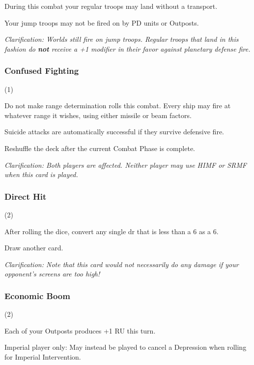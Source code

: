 
During this combat your regular troops may land without a transport.

Your jump troops may not be fired on by PD units or Outposts.

\textit{Clarification: Worlds still fire on jump troops. Regular troops that land in this fashion do \textbf{not} receive a +1 modifier in their favor against planetary defense fire.}

\subsubsection{Confused Fighting} (1)


Do not make range determination rolls this combat. Every ship may fire at whatever range it wishes, using either missile or beam factors.

Suicide attacks are automatically successful if they survive defensive fire.

Reshuffle the deck after the current Combat Phase is complete.

\textit{Clarification: Both players are affected. Neither player may use HIMF or SRMF when this card is played.}

\subsubsection{Direct Hit} (2)


After rolling the dice, convert any single dr that is less than a 6 as a 6.

Draw another card.

\textit{Clarification: Note that this card would not necessarily do any damage if your opponent's screens are too high!}

\subsubsection{Economic Boom} (2)


Each of your Outposts produces +1 RU this turn.

Imperial player only: May instead be played to cancel a Depression when rolling for Imperial Intervention.


